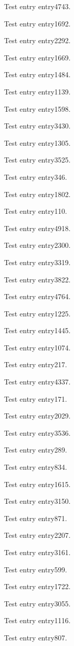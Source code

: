 Test entry \gls{entry4743}.

Test entry \gls{entry1692}.

Test entry \gls{entry2292}.

Test entry \gls{entry1669}.

Test entry \gls{entry1484}.

Test entry \gls{entry1139}.

Test entry \gls{entry1598}.

Test entry \gls{entry3430}.

Test entry \gls{entry1305}.

Test entry \gls{entry3525}.

Test entry \gls{entry346}.

Test entry \gls{entry1802}.

Test entry \gls{entry110}.

Test entry \gls{entry4918}.

Test entry \gls{entry2300}.

Test entry \gls{entry3319}.

Test entry \gls{entry3822}.

Test entry \gls{entry4764}.

Test entry \gls{entry1225}.

Test entry \gls{entry1445}.

Test entry \gls{entry1074}.

Test entry \gls{entry217}.

Test entry \gls{entry4337}.

Test entry \gls{entry171}.

Test entry \gls{entry2029}.

Test entry \gls{entry3536}.

Test entry \gls{entry289}.

Test entry \gls{entry834}.

Test entry \gls{entry1615}.

Test entry \gls{entry3150}.

Test entry \gls{entry871}.

Test entry \gls{entry2207}.

Test entry \gls{entry3161}.

Test entry \gls{entry599}.

Test entry \gls{entry1722}.

Test entry \gls{entry3055}.

Test entry \gls{entry1116}.

Test entry \gls{entry807}.

